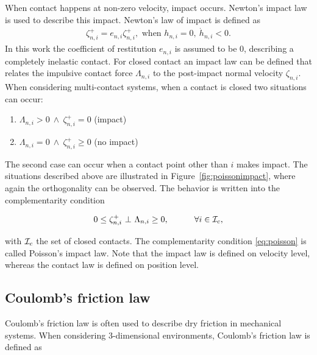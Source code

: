 \documentclass[../DC2017114Bouma.tex]{subfiles}
\begin{document}
When contact happens at non-zero velocity, impact occurs. Newton's impact law is used to describe this impact. Newton's law of impact is defined as
\begin{align}
\zeta^+_{n,i} = e_{n,i}\zeta^+_{n,i},\text{ when }h_{n,i}=0,\ \dot{h}_{n,i}<0.
\end{align}
In this work the coefficient of restitution $e_{n,i}$ is assumed to be $0$, describing a completely inelastic contact. For closed contact an impact law can be defined that relates the impulsive contact force $\Lambda_{n,i}$ to the post-impact normal velocity $\zeta_{n,i}$. When considering multi-contact systems, when a contact is closed two situations can occur:
\begin{enumerate}
\item $\Lambda_{n,i} > 0\ \wedge\ \zeta^+_{n,i} = 0$ (impact)
\item $\Lambda_{n,i} = 0\ \wedge\ \zeta^+_{n,i} \geq 0$ (no impact)
\end{enumerate}
The second case can occur when a contact point other than $i$ makes impact. The situations described above are illustrated in Figure~\ref{fig:poissonimpact}, where again the orthogonality can be observed. The behavior is written into the complementarity condition

\begin{align}
0\leq \zeta^+_{n,i}\ \bot\ \Lambda_{n,i} \geq 0,\quad  \qquad \forall i\in\mathcal{I}_c,\label{eq:poisson}
\end{align}

with $\mathcal{I}_c$ the set of closed contacts. The complementarity condition \eqref{eq:poisson} is called Poisson's impact law. Note that the impact law is defined on velocity level, whereas the contact law is defined on position level.
\subsection{Coulomb's friction law}
Coulomb's friction law is often used to describe dry friction in mechanical systems. When considering 3-dimensional environments, Coulomb's friction law is defined as 
\end{document}
